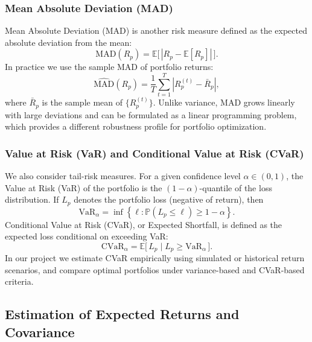 \documentclass[12pt]{article}
\begin{document}
\subsubsection{Mean Absolute Deviation (MAD)}

Mean Absolute Deviation (MAD) is another risk measure defined as the expected absolute deviation from the mean:
\begin{equation}
    \mathrm{MAD}(R_p) = \mathbb{E}\big[\,|R_p - \mathbb{E}[R_p]|\,\big].
\end{equation}
In practice we use the sample MAD of portfolio returns:
\begin{equation}
    \widehat{\mathrm{MAD}}(R_p)
    = \frac{1}{T} \sum_{t=1}^{T} 
        \left| R_p^{(t)} - \bar{R}_p \right|,
\end{equation}
where $\bar{R}_p$ is the sample mean of $\{R_p^{(t)}\}$. Unlike variance, MAD grows linearly with large deviations and can be formulated as a linear programming problem, which provides a different robustness profile for portfolio optimization.

\subsubsection{Value at Risk (VaR) and Conditional Value at Risk (CVaR)}

We also consider tail-risk measures. For a given confidence level $\alpha \in (0,1)$, the Value at Risk (VaR) of the portfolio is the $(1-\alpha)$-quantile of the loss distribution. If $L_p$ denotes the portfolio loss (negative of return), then
\begin{equation}
    \mathrm{VaR}_{\alpha} = \inf \left\{ \ell : \mathbb{P}(L_p \le \ell) \ge 1 - \alpha \right\}.
\end{equation}
Conditional Value at Risk (CVaR), or Expected Shortfall, is defined as the expected loss conditional on exceeding VaR:
\begin{equation}
    \mathrm{CVaR}_{\alpha} = \mathbb{E}\big[\,L_p \mid L_p \ge \mathrm{VaR}_{\alpha}\,\big].
\end{equation}
In our project we estimate CVaR empirically using simulated or historical return scenarios, and compare optimal portfolios under variance-based and CVaR-based criteria.

\subsection{Estimation of Expected Returns and Covariance}
\end{document}
